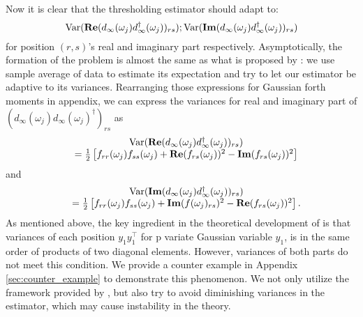 Now it is clear that the thresholding estimator should adapt to: 
\[
\mathrm{Var}(\mathbf{Re}(d_{\infty}(\omega_j)d^\dag_{\infty}(\omega_j))_{rs}); 
\mathrm{Var}(\mathbf{Im}(d_{\infty}(\omega_j)d^\dag_{\infty}(\omega_j))_{rs})
\]
for position $(r,s)$'s real and imaginary part respectively. Asymptotically, the formation of the problem is almost the same as what is proposed by \cite{cai2011adaptive}: we use sample average of data to estimate its expectation and try to let our estimator be adaptive to its variances. Rearranging those expressions for Gaussian forth moments in appendix, we can express the variances for real and imaginary part of $(d_{\infty}(\omega_j)d_{\infty}(\omega_j)^\dag)_{rs}$ as 
\begin{equation}
\label{eq:variance_of_periodogram}
\begin{array}{cc}
&\mathrm{Var}(\mathbf{Re}(d_{\infty}(\omega_j)d^\dag_{\infty}(\omega_j))_{rs})      \\
& = \frac{1}{2}\left[f_{rr}(\omega_j)f_{ss}(\omega_j)+\mathbf{Re}(f_{rs}(\omega_j))^2-\mathbf{Im}(f_{rs}(\omega_j))^2\right]
\end{array}
\end{equation}
and 
\begin{equation}
\begin{array}{cc}
&\mathrm{Var}(\mathbf{Im}(d_{\infty}(\omega_j)d^\dag_{\infty}(\omega_j))_{rs})      \\
& = \frac{1}{2}\left[f_{rr}(\omega_j)f_{ss}(\omega_j)+\mathbf{Im}(f(\omega_j)_{rs})^2-\mathbf{Re}(f_{rs}(\omega_j))^2\right].
\end{array}
\end{equation}
As mentioned above, the key ingredient in the theoretical development of \cite{cai2011adaptive} is that variances of each position $y_1y_1^\top$ for p variate Gaussian variable $y_1$,  is in the same order of products of two diagonal elements. However, variances of both parts do not meet this condition. We provide a counter example in Appendix \ref{sec:counter_example} to demonstrate this phenomenon.
We not only utilize the framework provided by \cite{cai2011adaptive}, but also try to avoid diminishing variances in the estimator, which may cause instability in the theory. \par 


